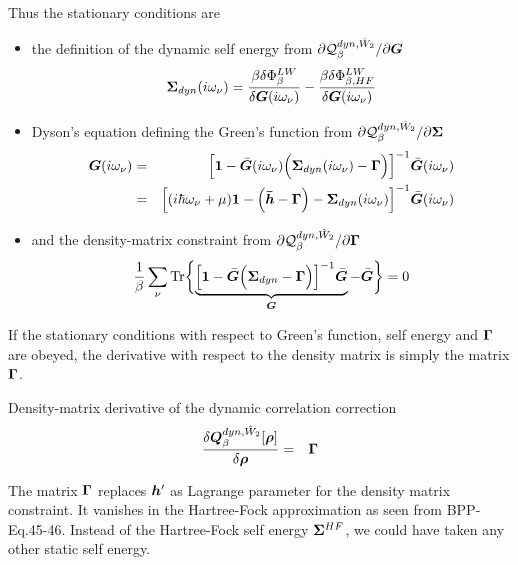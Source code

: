 \documentclass[11pt,a4paper]{report}
\begin{document}
Thus the stationary conditions are
\begin{itemize}
\item the definition of the dynamic self energy 
from $\partial\mathcal{Q}_{\beta}^{dyn,\hat{W}_2}/\partial\bm{G}$
\begin{eqnarray}
\bm{\Sigma}_{dyn}(i\omega_\nu)
=\frac{\beta\delta\Phi^{LW}_\beta}{\delta\bm{G}(i\omega_\nu)}
-\frac{\beta\delta\Phi^{LW}_{\beta,HF}}{\delta\bm{G}(i\omega_\nu)}
\end{eqnarray}
%
\item Dyson's equation defining the Green's function
from $\partial\mathcal{Q}_{\beta}^{dyn,\hat{W}_2}/\partial\bm{\Sigma}$
\begin{eqnarray}
\bm{G}(i\omega_\nu)&=&\Bigl[\bm{1}-\bar{\bm{G}}(i\omega_\nu)
\Bigl(\bm{\Sigma}_{dyn}(i\omega_\nu)-\bm{\Gamma}\Bigr)\Bigr]^{-1}
\bar{\bm{G}}(i\omega_\nu)
\nonumber\\
&=&\Bigl[(i\hbar\omega_\nu+\mu)\bm{1}-\Bigl(\bm{\bar{h}}-\bm{\Gamma}\Bigr)
-\bm{\Sigma}_{dyn}(i\omega_\nu)\Bigr]^{-1}
\bar{\bm{G}}(i\omega_\nu)
\end{eqnarray}
%
\item and the density-matrix constraint
from $\partial\mathcal{Q}_{\beta}^{dyn,\hat{W}_2}/\partial\bm{\Gamma}$
\begin{eqnarray}
\frac{1}{\beta}\sum_\nu\mathrm{Tr}\biggl\lbrace
\underbrace{\Bigl[\bm{1}-\bar{\bm{G}}
\Bigl(\bm{\Sigma}_{dyn}-\bm{\Gamma}\Bigr)\Bigr]^{-1}
\bar{\bm{G}}}_{\bm{G}}
-\bar{\bm{G}}
\biggr\rbrace=0
\end{eqnarray}
\end{itemize}
If the stationary conditions with respect to Green's function, self
energy and $\bm{\Gamma}$ are obeyed, the derivative with respect to the
density matrix is simply the matrix $\bm{\Gamma}$.
\begin{myshadowminipage}{Density-matrix derivative of the dynamic correlation correction}
\begin{eqnarray}
\frac{\delta\bm{Q}^{dyn,\hat{W}_2}_\beta[\bm{\rho}]}{\delta\bm{\rho}}
&=&\bm{\Gamma}
\end{eqnarray}
\end{myshadowminipage}

The matrix $\bm{\Gamma}$ replaces $\bm{h}'$ as Lagrange parameter
for the density matrix constraint.  It vanishes in the Hartree-Fock
approximation as seen from
BPP-Eq.45-46\cite{bloechl13_prb88_25139}. Instead of the Hartree-Fock
self energy $\bm{\Sigma}^{HF}$, we could have taken any other static
self energy.
\end{document}
